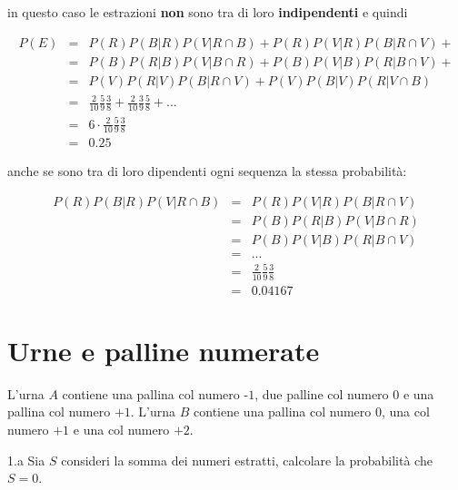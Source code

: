 \documentclass[
  11pt,
]{book}
\theoremstyle{mytheoremstyle}
\theoremstyle{mydefstyle}
\newenvironment{nota}
  {
\begin{tcolorbox}[enhanced,breakable,arc=0.1mm,boxrule=1pt,colback=white,colframe=iblue,title=\bf \fontfamily{lmss}\selectfont \faInfoCircle \hspace{.5 cm} Nota,drop fuzzy shadow]
}{
\end{tcolorbox}
  }
\newenvironment{sol}
  {
  \begin{tcolorbox}[enhanced,breakable,arc=0.1mm,boxrule=1pt,colback=white,colframe=iblue,
  title=\bf \fontfamily{lmss}\selectfont \hspace{.5 cm} Soluzione,drop fuzzy shadow]

}{
\end{tcolorbox}
  }
\begin{document}
\begin{sol}
in questo caso le estrazioni \textbf{non} sono tra di loro \textbf{indipendenti} e quindi

\begin{eqnarray*}
  P(E)  &=& P(R)P(B|R)P(V|R\cap B)+P(R)P(V|R)P(B|R\cap V)+\\
        &=& P(B)P(R|B)P(V|B\cap R)+P(B)P(V|B)P(R|B\cap V)+\\
        &=& P(V)P(R|V)P(B|R\cap V)+P(V)P(B|V)P(R|V\cap B)\\
        &=& \frac2{10}\frac5{9}\frac3{8}+\frac2{10}\frac3{9}\frac5{8}+...\\
        &=& 6 \cdot \frac2{10}\frac5{9}\frac3{8}\\
        &=& 0.25
\end{eqnarray*}

\begin{nota}
anche se sono tra di loro dipendenti ogni sequenza la stessa probabilità:

\end{nota}

\begin{eqnarray*}
 P(R)P(B|R)P(V|R\cap B)&=&P(R)P(V|R)P(B|R\cap V)\\
        &=& P(B)P(R|B)P(V|B\cap R)\\
        &=& P(B)P(V|B)P(R|B\cap V)\\
        &=& ...\\
        &=& \frac2{10}\frac5{9}\frac3{8}\\
        &=& 0.04167
\end{eqnarray*}

\end{sol}

\section{Urne e palline numerate}\label{urne-e-palline-numerate}

L'urna \(A\) contiene una pallina col numero \(\mbox{-1}\), due palline col numero \(\mbox{0}\)
e una pallina col numero \(\mbox{+1}\).
L'urna \(B\) contiene una pallina col numero \(\mbox{0}\), una col numero \(\mbox{+1}\)
e una col numero \(\mbox{+2}\).

1.a Sia \(S\) consideri la somma dei numeri estratti, calcolare la probabilità che
\(S=0\).
\end{document}
